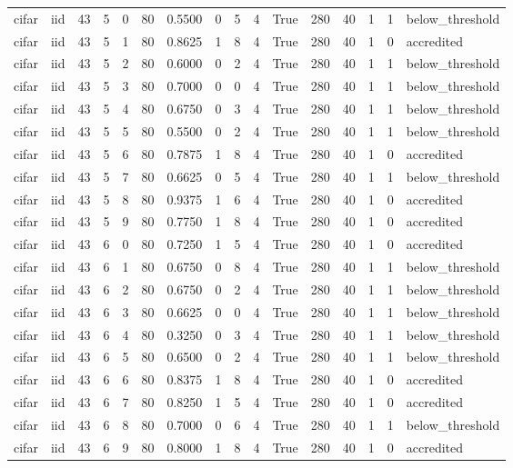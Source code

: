 \begin{tabular}{llrrrrrrrrrrrrrl}
cifar & iid & 43 & 5 & 0 & 80 & 0.5500 & 0 & 5 & 4 & True & 280 & 40 & 1 & 1 & below\_threshold \\
cifar & iid & 43 & 5 & 1 & 80 & 0.8625 & 1 & 8 & 4 & True & 280 & 40 & 1 & 0 & accredited \\
cifar & iid & 43 & 5 & 2 & 80 & 0.6000 & 0 & 2 & 4 & True & 280 & 40 & 1 & 1 & below\_threshold \\
cifar & iid & 43 & 5 & 3 & 80 & 0.7000 & 0 & 0 & 4 & True & 280 & 40 & 1 & 1 & below\_threshold \\
cifar & iid & 43 & 5 & 4 & 80 & 0.6750 & 0 & 3 & 4 & True & 280 & 40 & 1 & 1 & below\_threshold \\
cifar & iid & 43 & 5 & 5 & 80 & 0.5500 & 0 & 2 & 4 & True & 280 & 40 & 1 & 1 & below\_threshold \\
cifar & iid & 43 & 5 & 6 & 80 & 0.7875 & 1 & 8 & 4 & True & 280 & 40 & 1 & 0 & accredited \\
cifar & iid & 43 & 5 & 7 & 80 & 0.6625 & 0 & 5 & 4 & True & 280 & 40 & 1 & 1 & below\_threshold \\
cifar & iid & 43 & 5 & 8 & 80 & 0.9375 & 1 & 6 & 4 & True & 280 & 40 & 1 & 0 & accredited \\
cifar & iid & 43 & 5 & 9 & 80 & 0.7750 & 1 & 8 & 4 & True & 280 & 40 & 1 & 0 & accredited \\
cifar & iid & 43 & 6 & 0 & 80 & 0.7250 & 1 & 5 & 4 & True & 280 & 40 & 1 & 0 & accredited \\
cifar & iid & 43 & 6 & 1 & 80 & 0.6750 & 0 & 8 & 4 & True & 280 & 40 & 1 & 1 & below\_threshold \\
cifar & iid & 43 & 6 & 2 & 80 & 0.6750 & 0 & 2 & 4 & True & 280 & 40 & 1 & 1 & below\_threshold \\
cifar & iid & 43 & 6 & 3 & 80 & 0.6625 & 0 & 0 & 4 & True & 280 & 40 & 1 & 1 & below\_threshold \\
cifar & iid & 43 & 6 & 4 & 80 & 0.3250 & 0 & 3 & 4 & True & 280 & 40 & 1 & 1 & below\_threshold \\
cifar & iid & 43 & 6 & 5 & 80 & 0.6500 & 0 & 2 & 4 & True & 280 & 40 & 1 & 1 & below\_threshold \\
cifar & iid & 43 & 6 & 6 & 80 & 0.8375 & 1 & 8 & 4 & True & 280 & 40 & 1 & 0 & accredited \\
cifar & iid & 43 & 6 & 7 & 80 & 0.8250 & 1 & 5 & 4 & True & 280 & 40 & 1 & 0 & accredited \\
cifar & iid & 43 & 6 & 8 & 80 & 0.7000 & 0 & 6 & 4 & True & 280 & 40 & 1 & 1 & below\_threshold \\
cifar & iid & 43 & 6 & 9 & 80 & 0.8000 & 1 & 8 & 4 & True & 280 & 40 & 1 & 0 & accredited \\

\end{tabular}

